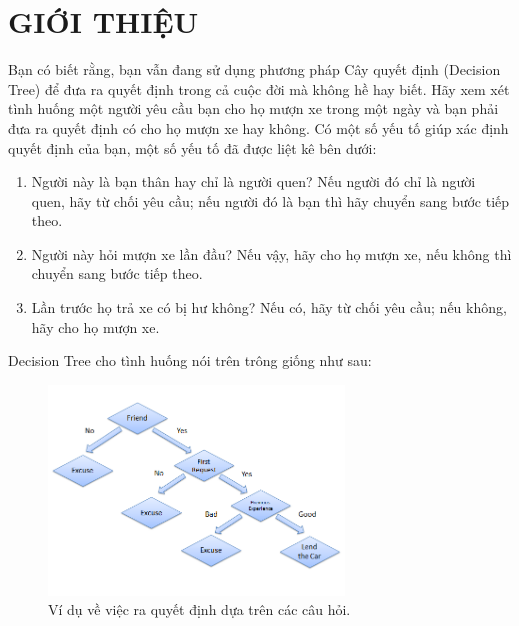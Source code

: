 \chapter {GIỚI THIỆU}

Bạn có biết rằng, bạn vẫn đang sử dụng phương pháp Cây quyết định (Decision Tree)
để đưa ra quyết định trong cả cuộc đời mà không hề hay biết.
Hãy xem xét tình huống một người yêu cầu bạn cho họ mượn xe trong một ngày
và bạn phải đưa ra quyết định có cho họ mượn xe hay không. Có một số yếu tố
giúp xác định quyết định của bạn, một số yếu tố đã được liệt kê bên dưới:

\begin{enumerate}
    \item Người này là bạn thân hay chỉ là người quen?
    Nếu người đó chỉ là người quen, hãy từ chối yêu cầu;
    nếu người đó là bạn thì hãy chuyển sang bước tiếp theo.
    \item Người này hỏi mượn xe lần đầu? Nếu vậy, hãy cho họ mượn xe,
    nếu không thì chuyển sang bước tiếp theo.
    \item Lần trước họ trả xe có bị hư không? Nếu có, hãy từ chối yêu cầu;
    nếu không, hãy cho họ mượn xe.
\end{enumerate}

Decision Tree cho tình huống nói trên trông giống như sau:

\begin{figure}[h!]
    \centering
    \includegraphics[width=0.7\textwidth]{thesis/decision-tree/intro/dt_ex1.png}
    \caption{Ví dụ về việc ra quyết định dựa trên các câu hỏi.}
    \label{fig:dt_ex1}
\end{figure}
